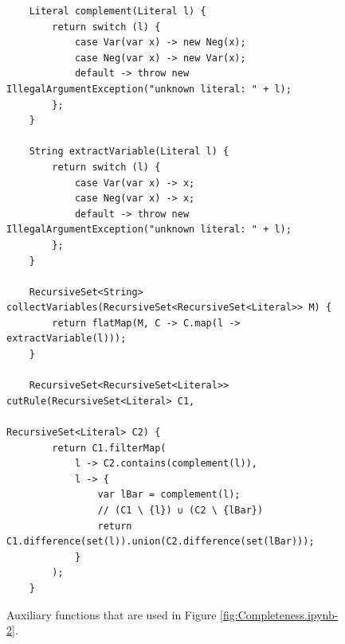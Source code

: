 \begin{figure}[!ht]
\centering
\begin{verbatim}
    Literal complement(Literal l) {
        return switch (l) {
            case Var(var x) -> new Neg(x);
            case Neg(var x) -> new Var(x);
            default -> throw new IllegalArgumentException("unknown literal: " + l);
        };
    }
    
    String extractVariable(Literal l) {
        return switch (l) {
            case Var(var x) -> x;
            case Neg(var x) -> x;
            default -> throw new IllegalArgumentException("unknown literal: " + l);
        };
    }
      
    RecursiveSet<String> collectVariables(RecursiveSet<RecursiveSet<Literal>> M) {
        return flatMap(M, C -> C.map(l -> extractVariable(l)));
    }
    
    RecursiveSet<RecursiveSet<Literal>> cutRule(RecursiveSet<Literal> C1,
                                                RecursiveSet<Literal> C2) {
        return C1.filterMap(
            l -> C2.contains(complement(l)),
            l -> {
                var lBar = complement(l);
                // (C1 \ {l}) ∪ (C2 \ {lBar})
                return C1.difference(set(l)).union(C2.difference(set(lBar)));
            }
        );
    }
\end{verbatim}
\vspace*{-0.3cm}
\caption{Auxiliary functions that are used in Figure \ref{fig:Completeness.ipynb-2}.}
\label{fig:Completeness.ipynb-1}
\end{figure}

